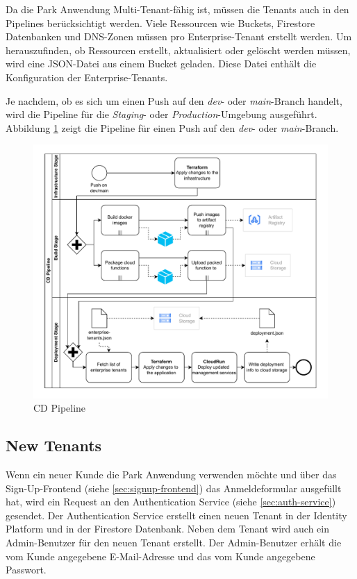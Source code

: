 Da die Park Anwendung Multi-Tenant-fähig ist, müssen die Tenants auch in den Pipelines berücksichtigt werden.
Viele Ressourcen wie Buckets, Firestore Datenbanken und DNS-Zonen müssen pro Enterprise-Tenant erstellt werden.
Um herauszufinden, ob Ressourcen erstellt, aktualisiert oder gelöscht werden müssen, wird eine JSON-Datei 
aus einem Bucket geladen. Diese Datei enthält die Konfiguration der Enterprise-Tenants.

Je nachdem, ob es sich um einen Push auf den \textit{dev}- oder \textit{main}-Branch handelt, wird die Pipeline
für die \textit{Staging}- oder \textit{Production}-Umgebung ausgeführt.
Abbildung \ref{fig:cd-pipeline} zeigt die Pipeline für einen Push auf den \textit{dev}- oder \textit{main}-Branch.

\begin{figure}[H]
  \centering
  \includegraphics[width=\textwidth]{resources/cd-pipeline.pdf}
  \caption{CD Pipeline}
  \label{fig:cd-pipeline}
\end{figure}


\subsection{New Tenants}

Wenn ein neuer Kunde die Park Anwendung verwenden möchte und über das Sign-Up-Frontend (siehe \ref{sec:signup-frontend})
das Anmeldeformular ausgefüllt hat, wird ein Request an den Authentication Service (siehe \ref{sec:auth-service}) gesendet.
Der Authentication Service erstellt einen neuen Tenant in der Identity Platform und in der Firestore Datenbank.
Neben dem Tenant wird auch ein Admin-Benutzer für den neuen Tenant erstellt. Der Admin-Benutzer 
erhält die vom Kunde angegebene E-Mail-Adresse und das vom Kunde angegebene Passwort.

